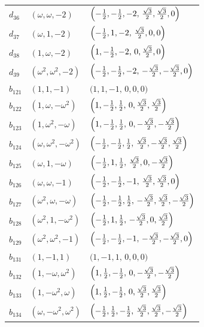 \documentclass[%
  reprint,
  superscriptaddress,
  amsmath,amssymb,
  pra,
  floatfix,
  longbibliography
]{revtex4-2}
\begin{document}
\begin{longtable}{lll}
$d_{36}$ & $(\omega,\omega,-2)$ &
$\Bigl(-\tfrac12,-\tfrac12,-2,\,\tfrac{\sqrt{3}}{2},\tfrac{\sqrt{3}}{2},0\Bigr)$ \\
$d_{37}$ & $(\omega,1,-2)$ &
$\Bigl(-\tfrac12,1,-2,\,\tfrac{\sqrt{3}}{2},0,0\Bigr)$ \\
$d_{38}$ & $(1,\omega,-2)$ &
$\Bigl(1,-\tfrac12,-2,\,0,\tfrac{\sqrt{3}}{2},0\Bigr)$ \\
$d_{39}$ & $(\omega^2,\omega^2,-2)$ &
$\Bigl(-\tfrac12,-\tfrac12,-2,\,-\tfrac{\sqrt{3}}{2},-\tfrac{\sqrt{3}}{2},0\Bigr)$ \\
$b_{121}$ & $(1,1,-1)$ &
$\bigl(1,1,-1,\,0,0,0\bigr)$ \\
$b_{122}$ & $(1,\omega,-\omega^2)$ &
$\Bigl(1,-\tfrac12,\tfrac12,\,0,\tfrac{\sqrt{3}}{2},\tfrac{\sqrt{3}}{2}\Bigr)$ \\
$b_{123}$ & $(1,\omega^2,-\omega)$ &
$\Bigl(1,-\tfrac12,\tfrac12,\,0,-\tfrac{\sqrt{3}}{2},-\tfrac{\sqrt{3}}{2}\Bigr)$ \\
$b_{124}$ & $(\omega,\omega^2,-\omega^2)$ &
$\Bigl(-\tfrac12,-\tfrac12,\tfrac12,\,\tfrac{\sqrt{3}}{2},-\tfrac{\sqrt{3}}{2},\tfrac{\sqrt{3}}{2}\Bigr)$ \\
$b_{125}$ & $(\omega,1,-\omega)$ &
$\Bigl(-\tfrac12,1,\tfrac12,\,\tfrac{\sqrt{3}}{2},0,-\tfrac{\sqrt{3}}{2}\Bigr)$ \\
$b_{126}$ & $(\omega,\omega,-1)$ &
$\Bigl(-\tfrac12,-\tfrac12,-1,\,\tfrac{\sqrt{3}}{2},\tfrac{\sqrt{3}}{2},0\Bigr)$ \\
$b_{127}$ & $(\omega^2,\omega,-\omega)$ &
$\Bigl(-\tfrac12,-\tfrac12,\tfrac12,\,-\tfrac{\sqrt{3}}{2},\tfrac{\sqrt{3}}{2},-\tfrac{\sqrt{3}}{2}\Bigr)$ \\
$b_{128}$ & $(\omega^2,1,-\omega^2)$ &
$\Bigl(-\tfrac12,1,\tfrac12,\,-\tfrac{\sqrt{3}}{2},0,\tfrac{\sqrt{3}}{2}\Bigr)$ \\
$b_{129}$ & $(\omega^2,\omega^2,-1)$ &
$\Bigl(-\tfrac12,-\tfrac12,-1,\,-\tfrac{\sqrt{3}}{2},-\tfrac{\sqrt{3}}{2},0\Bigr)$ \\
$b_{131}$ & $(1,-1,1)$ &
$\bigl(1,-1,1,\,0,0,0\bigr)$ \\
$b_{132}$ & $(1,-\omega,\omega^2)$ &
$\Bigl(1,\tfrac12,-\tfrac12,\,0,-\tfrac{\sqrt{3}}{2},-\tfrac{\sqrt{3}}{2}\Bigr)$ \\
$b_{133}$ & $(1,-\omega^2,\omega)$ &
$\Bigl(1,\tfrac12,-\tfrac12,\,0,\tfrac{\sqrt{3}}{2},\tfrac{\sqrt{3}}{2}\Bigr)$ \\
$b_{134}$ & $(\omega,-\omega^2,\omega^2)$ &
$\Bigl(-\tfrac12,\tfrac12,-\tfrac12,\,\tfrac{\sqrt{3}}{2},\tfrac{\sqrt{3}}{2},-\tfrac{\sqrt{3}}{2}\Bigr)$ \\

\end{longtable}
\end{document}
